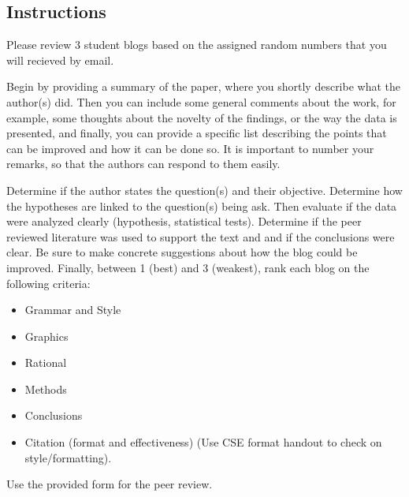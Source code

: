 \documentclass{tufte-handout}\usepackage[]{graphicx}\usepackage[]{color}
\begin{document}
\subsection{Instructions}

Please review 3 student blogs based on the assigned random numbers that you will recieved by email. 

Begin by providing a summary of the paper, where you shortly describe what the author(s) did. Then you can include some general comments about the work, for example, some thoughts about the novelty of the findings, or the way the data is presented, and finally, you can provide a specific list describing the points that can be improved and how it can be done so. It is important to number your remarks, so that the authors can respond to them easily.

Determine if the author states the question(s) and their objective. Determine how the hypotheses are linked to the question(s) being ask. Then evaluate if the data were analyzed clearly (hypothesis, statistical tests). Determine if the peer reviewed literature was used to support the text and and if the conclusions were clear. Be sure to make concrete suggestions about how the blog could be improved. Finally, between 1 (best) and 3 (weakest), rank each blog on the following criteria: 

\begin{itemize}
 \item Grammar and Style
  \item Graphics 
  \item Rational
  \item Methods
  \item Conclusions
  \item Citation (format and effectiveness) (Use CSE format handout to check on style/formatting).
\end{itemize}

Use the provided form for the peer review.

\end{document}
